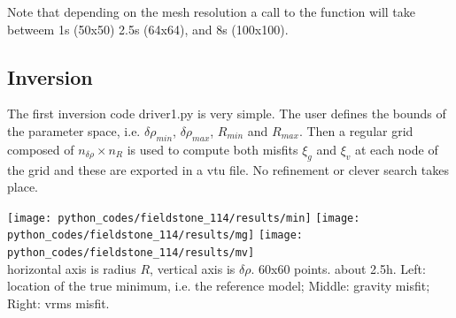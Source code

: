 Note that depending on the mesh resolution a call to the function will take betweem 1s 
(50x50) 2.5s (64x64), and 8s (100x100). 

\subsection*{Inversion}

The first inversion code {\pythonfile driver1.py} is very simple. The user defines the bounds of the 
parameter space, i.e. $\delta\rho_{min}$, $\delta\rho_{max}$, $R_{min}$ and $R_{max}$.
Then a regular grid composed of $n_{\delta\rho} \times n_{R}$ is used to compute 
both misfits $\xi_g$ and $\xi_v$ at each node of the grid and these are 
exported in a vtu file. No refinement or clever search takes place. 

\begin{center}
\texttt{[image: python\_codes/fieldstone\_114/results/min]}
\texttt{[image: python\_codes/fieldstone\_114/results/mg]}
\texttt{[image: python\_codes/fieldstone\_114/results/mv]}\\
{\captionfont horizontal axis is radius $R$, vertical axis is $\delta\rho$. 60x60 points. about 2.5h.
Left: location of the true minimum, i.e. the reference model; Middle: gravity misfit; Right: vrms misfit.} 
\end{center}




